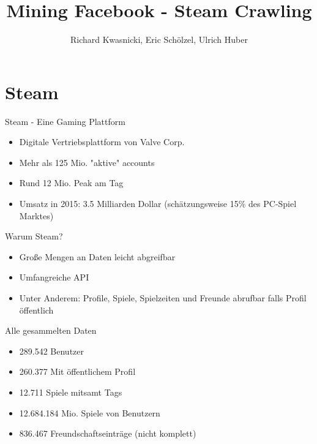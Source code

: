 \documentclass[12pt]{beamer}
\author{Richard Kwasnicki, Eric Schölzel, Ulrich Huber}
\title{Mining Facebook - Steam Crawling}
\begin{document}
\begin{frame}
\titlepage
\end{frame}


\section{Steam}
\begin{frame}{Steam - Eine Gaming Plattform}
	\begin{itemize}
		\item Digitale Vertriebsplattform von Valve Corp.
		\item Mehr als 125 Mio. "aktive" accounts
		\item Rund 12 Mio. Peak am Tag
		\item Umsatz in 2015:  3.5 Milliarden Dollar (schätzungsweise 15\% des PC-Spiel Marktes)
	\end{itemize}
\end{frame}

\begin{frame}{Warum Steam?}
	\begin{itemize}
		\item Große Mengen an Daten leicht abgreifbar
		\item Umfangreiche API
		\item Unter Anderem: Profile, Spiele, Spielzeiten und Freunde abrufbar falls Profil öffentlich 
	\end{itemize}
\end{frame}

\begin{frame}{Alle gesammelten Daten}
	\begin{itemize}
		\item 289.542 Benutzer
		\item 260.377 Mit öffentlichem Profil
		\item 12.711 Spiele mitsamt Tags
		\item 12.684.184 Mio. Spiele von Benutzern
		\item 836.467 Freundschaftseinträge (nicht komplett)
	\end{itemize}
\end{frame}
\end{document}
